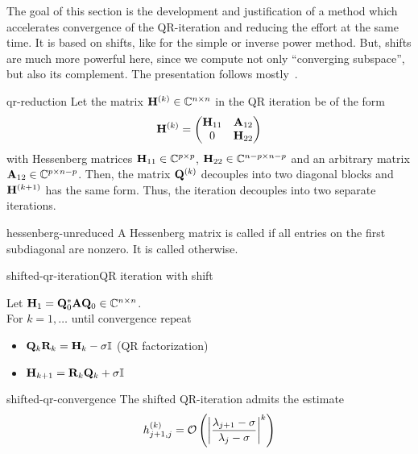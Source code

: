 \begin{intro}
  The goal of this section is the development and justification of a
  method which accelerates convergence of the QR-iteration and
  reducing the effort at the same time. It is based on shifts, like
  for the simple or inverse power method. But, shifts are much more
  powerful here, since we compute not only ``converging subspace'',
  but also its complement. The presentation follows
  mostly~\cite{GolubVanLoan83}.
\end{intro}

\begin{Theorem}{qr-reduction}
  Let the matrix $\matH^{(k)}\in\Cnn$ in the QR iteration be of the
  form
  \begin{gather}
    \matH^{(k)} =
    \begin{pmatrix}
      \matH_{11} & \mata_{12}\\0 & \matH_{22}
    \end{pmatrix}
  \end{gather}
  with Hessenberg matrices $\matH_{11}\in\C^{p\times p}$,
  $\matH_{22}\in \C^{n-p\times n-p}$ and an arbitrary matrix
  $\mata_{12}\in \C^{p\times n-p}$. Then, the matrix $\matq^{(k)}$
  decouples into two diagonal blocks and $\matH^{(k+1)}$ has the same
  form. Thus, the iteration decouples into two separate iterations.
\end{Theorem}

\begin{Definition}{hessenberg-unreduced}
  A Hessenberg matrix is called  if all entries on
  the first subdiagonal are nonzero. It is called 
  otherwise.
\end{Definition}

\begin{Algorithm*}{shifted-qr-iteration}{QR iteration with shift}
  
  Let $\matH_1 = \matq_0^*\mata\matq_0\in\Cnn$.\\
  For $k=1,\ldots$ until convergence repeat
  \begin{itemize}
  \item $\matq_k\matr_k = \matH_k - \sigma\id$ (QR factorization)
  \item $\matH_{k+1} = \matr_k\matq_k + \sigma\id$
  \end{itemize}
\end{Algorithm*}

\begin{Lemma}{shifted-qr-convergence}
  The shifted QR-iteration admits the estimate
  \begin{gather}
    h_{j+1,j}^{(k)} = \bigo \left(\abs*{\frac{\lambda_{j+1}-\sigma}{\lambda_j-\sigma}}^k\right)
  \end{gather}
\end{Lemma}

